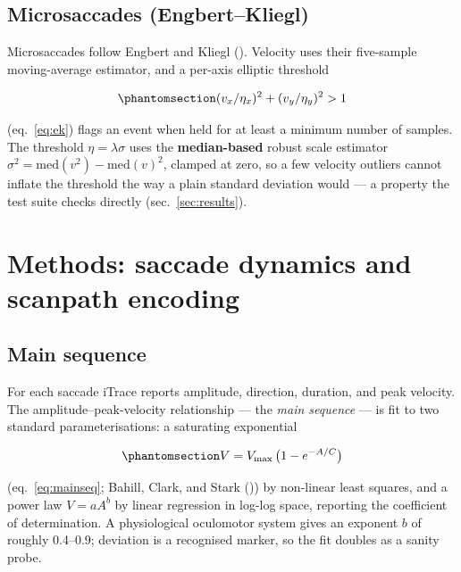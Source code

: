 \documentclass[
]{article}
\begin{document}
\subsection{Microsaccades
(Engbert--Kliegl)}\label{microsaccades-engbertkliegl}

Microsaccades follow Engbert and Kliegl
(). Velocity uses their
five-sample moving-average estimator, and a per-axis elliptic threshold

\begin{equation}\phantomsection\label{eq:ek}{ (v_x / \eta_x)^2 + (v_y / \eta_y)^2 > 1 }\end{equation}

(eq.~\ref{eq:ek}) flags an event when held for at least a minimum number
of samples. The threshold \(\eta = \lambda\sigma\) uses the
\textbf{median-based} robust scale estimator
\(\sigma^2 = \mathrm{med}(v^2) - \mathrm{med}(v)^2\), clamped at zero,
so a few velocity outliers cannot inflate the threshold the way a plain
standard deviation would --- a property the test suite checks directly
(sec.~\ref{sec:results}).

\section{Methods: saccade dynamics and scanpath
encoding}\label{sec:dynamics}

\subsection{Main sequence}\label{main-sequence}

For each saccade iTrace reports amplitude, direction, duration, and peak
velocity. The amplitude--peak-velocity relationship --- the \emph{main
sequence} --- is fit to two standard parameterisations: a saturating
exponential

\begin{equation}\phantomsection\label{eq:mainseq}{ V = V_{\max}\,\big(1 - e^{-A/C}\big) }\end{equation}

(eq.~\ref{eq:mainseq}; Bahill, Clark, and Stark
()) by non-linear least squares, and
a power law \(V = aA^b\) by linear regression in log-log space,
reporting the coefficient of determination. A physiological oculomotor
system gives an exponent \(b\) of roughly 0.4--0.9; deviation is a
recognised marker, so the fit doubles as a sanity probe.
\end{document}
